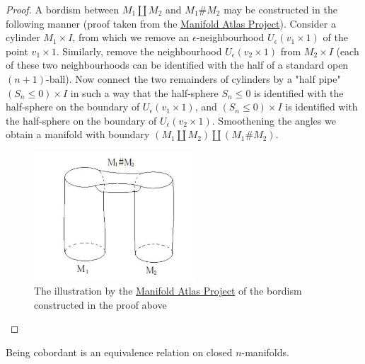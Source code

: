 \begin{proof} 
    A bordism between $M_1\coprod M_2$ and $M_1\#M_2$ may be constructed in the following manner (proof taken from the \href{http://www.map.mpim-bonn.mpg.de/Bordism#Connected_sum_and_bordism}{Manifold Atlas Project}). Consider a cylinder $M_1\times I$, from which we remove an $\epsilon$-neighbourhood $U_{\epsilon}(v_{1}\times 1)$ of the point $v_{1}\times 1$. Similarly, remove the neighbourhood $U_{\epsilon}(v_{2}\times 1)$ from $M_{2}\times I$ (each of these two neighbourhoods can be identified with the half of a standard open $(n+1)$-ball). Now connect the two remainders of cylinders by a "half pipe" $\left(S_{n}\leq 0 \right)\times I$ in such a way that the half-sphere $S_{n}\leq 0$ is identified with the half-sphere on the boundary of $U_{\epsilon}(v_{1}\times 1)$, and $\left(S_{n}\leq 0 \right)\times I$ is identified with the half-sphere on the boundary of $U_{\epsilon}(v_{2}\times 1)$. Smoothening the angles we obtain a manifold with boundary $(M_1\coprod M_2)\coprod(M_1\#M_2)$.
\begin{figure}[H]
\centering
\captionsetup{labelformat=empty, format = hang}
    \begin{measuredfigure}
        \includegraphics[width=6cm]{images/Lecture 2/Bordism connected sum to disjoint union.png} 
        \caption{\small{The illustration by the \href{http://www.map.mpim-bonn.mpg.de/Bordism\#Connected_sum_and_bordism}{Manifold Atlas Project} of the bordism constructed in the proof above}}
    \end{measuredfigure}
\end{figure}
\end{proof}
\begin{thm}
\label{Cobordant Equiv}
Being cobordant is an equivalence relation on closed $n$-manifolds. 
\end{thm}
